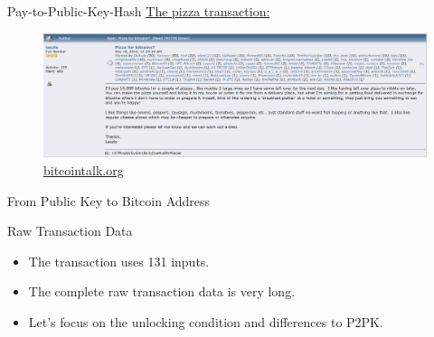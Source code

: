 \documentclass[]{beamer}
\begin{document}
%

\begin{frame}{Pay-to-Public-Key-Hash}
	\href{https://blockstream.info/tx/a1075db55d416d3ca199f55b6084e2115b9345e16c5cf302fc80e9d5fbf5d48d}{\link The pizza transaction:}\\
	\begin{figure}
	\includegraphics[scale=0.3]{../assets/images/pizza_blogpost}	
	\caption*{\href{https://bitcointalk.org/index.php?topic=137.0}{\link bitcointalk.org}}
	\end{figure}
\end{frame}

\begin{frame}{From Public Key to Bitcoin Address}
\begin{figure}
	
\end{figure}
\end{frame}

\begin{frame}{Raw Transaction Data}
	\begin{itemize}
		\item The transaction uses 131 inputs.
		\item The complete raw transaction data is very long.
		\item Let's focus on the unlocking condition and differences to P2PK.
	\end{itemize}
\end{frame}
\end{document}

